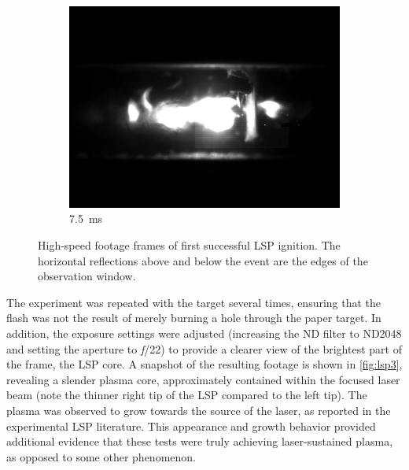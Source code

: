 \begin{figure}[h]
\begin{subfigure}[t]{0.32\textwidth}
                \end{subfigure}
                \hfill
                \begin{subfigure}[t]{0.32\textwidth}
                    \centering
                    \includegraphics[width=\textwidth]{assets/3 design/LSP1_frames/75.jpg}
                    \caption{7.5~ms}
                    \label{fig:lsp1_75}
                \end{subfigure}
                \caption{High-speed footage frames of first successful LSP ignition. The horizontal reflections above and below the event are the edges of the observation window.}
                \label{fig:lsp1}
            \end{figure}

            The experiment was repeated with the target several times, ensuring that the flash was not the result of merely burning a hole through the paper target. In addition, the exposure settings were adjusted (increasing the ND filter to ND2048 and setting the aperture to \textit{f}/22) to provide a clearer view of the brightest part of the frame, the LSP core. A snapshot of the resulting footage is shown in \autoref{fig:lsp3}, revealing a slender plasma core, approximately contained within the focused laser beam (note the thinner right tip of the LSP compared to the left tip). The plasma was observed to grow towards the source of the laser, as reported in the experimental LSP literature. This appearance and growth behavior provided additional evidence that these tests were truly achieving laser-sustained plasma, as opposed to some other phenomenon.


